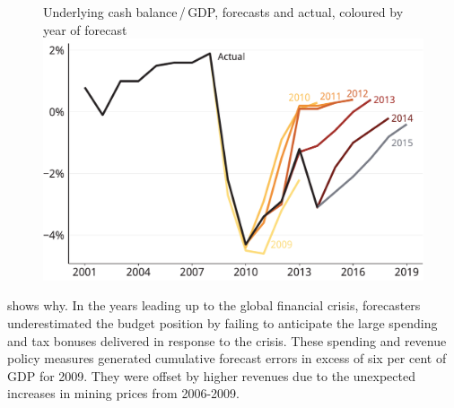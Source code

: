 \documentclass[twoside,english]{palatinob5portrait}
\begin{document}
\begin{figure}
%
{Underlying cash balance\,/\,GDP, forecasts and actual, coloured by year of forecast}
\includegraphics[width=\columnwidth]{b5-figure/FISCAL-Figure9a-1.pdf}
\end{figure}

 shows why. In the years leading up to the global financial crisis, forecasters underestimated the budget position by failing to anticipate the large spending and tax bonuses delivered in response to the crisis. These spending and revenue policy measures generated cumulative forecast errors in excess of six per cent of GDP for 2009.  They were offset by higher revenues due to the unexpected increases in mining prices from 2006-2009.
\end{document}
